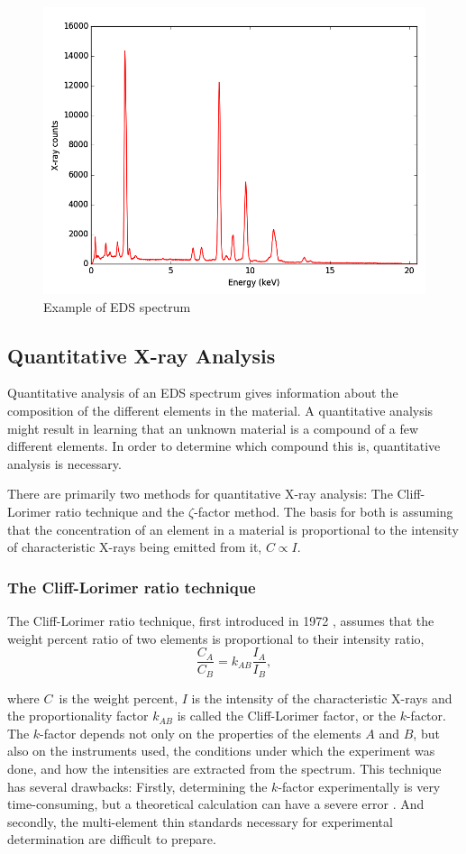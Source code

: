\begin{figure}
\centering
\includegraphics[width=0.7\linewidth]{fig/edx-example-spectrum}
\caption{Example of EDS spectrum}
\label{fig:eds-example-spectrum}
\end{figure}

	\subsection{Quantitative X-ray Analysis}
Quantitative analysis of an EDS spectrum gives information about the composition of the different elements in the material. A quantitative analysis might result in learning that an unknown material is a compound of a few different elements. In order to determine which compound this is, quantitative analysis is necessary.

There are primarily two methods for quantitative X-ray analysis: The Cliff-Lorimer ratio technique and the $\zeta$-factor method. The basis for both is assuming that the concentration of an element in a material is proportional to the intensity of characteristic X-rays being emitted from it, $C \propto I$.

		\subsubsection{The Cliff-Lorimer ratio technique}
The Cliff-Lorimer ratio technique, first introduced in 1972 \cite{cliff-lorimer}, assumes that the weight percent ratio of two elements is proportional to their intensity ratio,
\begin{equation}
\label{eq:CL-eq}
\frac{C_A}{C_B} = k_{AB}\frac{I_A}{I_B},
\end{equation}

where $C$ is the weight percent, $I$ is the intensity of the characteristic X-rays and the proportionality factor $k_{AB}$ is called the Cliff-Lorimer factor, or the $k$-factor. The $k$-factor depends not only on the properties of the elements $A$ and $B$, but also on the instruments used, the conditions under which the experiment was done, and how the intensities are extracted from the spectrum. This technique has several drawbacks: Firstly, determining the $k$-factor experimentally is very time-consuming, but a theoretical calculation can have a severe error \cite{williams-carter}. And secondly, the multi-element thin standards necessary for experimental determination are difficult to prepare.

